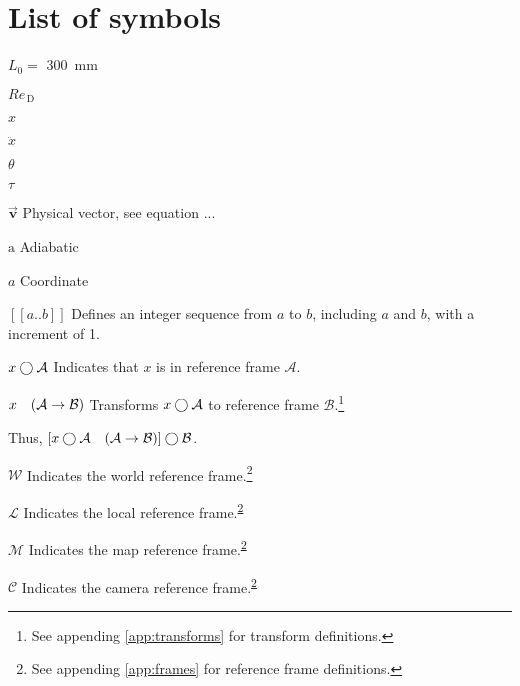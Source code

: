 \chapter{List of symbols}

\begin{Nomencl}[1cm]
    \item[$L_0 = $] \qty{300}{mm}

    \item[$\mathit{Re}_\mathrm{\,D}$]
    \item[$x$]         
    \item[$\ddot{x}$]  \\
    
    \item[$\theta$]    
    \item[$\tau$]      

    \item[$\overrightarrow{\bm{v}}$] Physical vector, see equation ...

    \item[$\mathrm{a}$] Adiabatic
    \item[$a$]          Coordinate

    \item[{\([\![a..b]\!]\)}] Defines an integer sequence from \(a\) to \(b\), including \(a\) and \(b\), with a increment of 1.
    \item[\(x\bigcirc\mathcal{A}\)] Indicates that \(x\) is in reference frame \(\mathcal{A}\).
    \item[\(x\transframe{A}{B}\)] Transforms \(x\bigcirc\mathcal{A}\) to reference frame \(\mathcal{B}\).\footnote{See appending \ref{app:transforms} for transform definitions.}

    \hspace{0.5cm} Thus, \(\left[x\inrefframe{A}\transframe{A}{B}\right]\inrefframe{B}\).
    \item[\(\mathcal{W}\)] Indicates the world reference frame.\footnote{\label{note1}See appending \ref{app:frames} for reference frame definitions.}
    \item[\(\mathcal{L}\)] Indicates the local reference frame.\textsuperscript{\ref{note1}}
    \item[\(\mathcal{M}\)] Indicates the map reference frame.\textsuperscript{\ref{note1}}
    \item[\(\mathcal{C}\)] Indicates the camera reference frame.\textsuperscript{\ref{note1}}
    
\end{Nomencl}

